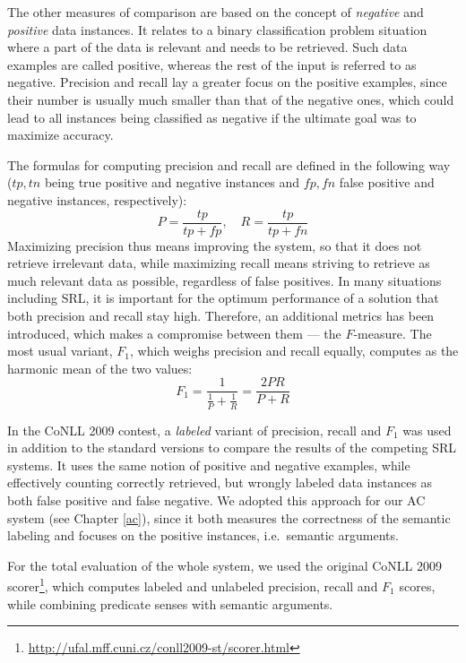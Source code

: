 \documentclass[12pt,notitlepage]{report}
\begin{document}
The other measures of comparison are based on the concept of \emph{negative} and \emph{positive} data instances. It relates to a binary classification problem situation where a part of the data is relevant and needs to be retrieved. Such data examples are called positive, whereas the rest of the input is referred to as negative. Precision and recall lay a greater focus on the positive examples, since their number is usually much smaller than that of the negative ones, which could lead to all instances being classified as negative if the ultimate goal was to maximize accuracy.

The formulas for computing precision and recall are defined in the following way ($tp,tn$ being true positive and negative instances and $fp,fn$ false positive and negative instances, respectively):
\begin{equation}
P = \frac{tp}{tp + fp},\quad R = \frac{tp}{tp + fn}
\end{equation}
Maximizing precision thus means improving the system, so that it does not retrieve irrelevant data, while maximizing recall means striving to retrieve as much relevant data as possible, regardless of false positives. In many situations including SRL, it is important for the optimum performance of a solution that both precision and recall stay high. Therefore, an additional metrics has been introduced, which makes a compromise between them --- the $F$-measure. The most usual variant, $F_1$, which weighs precision and recall equally, computes as the harmonic mean of the two values:
\begin{equation}
F_1 = \frac{1}{\frac{1}{P} + \frac{1}{R}} = \frac{2PR}{P+R}
\end{equation}

In the CoNLL 2009 contest, a \emph{labeled} variant of precision, recall and $F_1$ \citep{hajic09} was used in addition to the standard versions to compare the results of the competing SRL systems. It uses the same notion of positive and negative examples, while effectively counting correctly retrieved, but wrongly labeled data instances as both false positive and false negative. We adopted this approach for our AC system (see Chapter \ref{ac}), since it both measures the correctness of the semantic labeling and focuses on the positive instances, i.e.\ semantic arguments.

For the total evaluation of the whole system, we used the original CoNLL 2009 scorer\footnote{\url{http://ufal.mff.cuni.cz/conll2009-st/scorer.html}}, which computes labeled and unlabeled precision, recall and $F_1$ scores, while combining predicate senses with semantic arguments.
\end{document}
